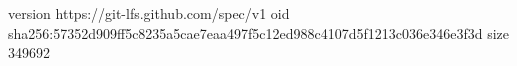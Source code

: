 version https://git-lfs.github.com/spec/v1
oid sha256:57352d909ff5c8235a5cae7eaa497f5c12ed988c4107d5f1213c036e346e3f3d
size 349692
